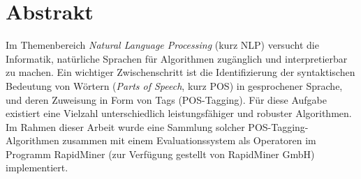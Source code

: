 %
\chapter*{Abstrakt}
\label{sec:abstract}
\vspace*{-10mm}

Im Themenbereich \textit{Natural Language Processing} (kurz NLP) versucht die Informatik, natürliche Sprachen für Algorithmen zugänglich und interpretierbar zu machen. Ein wichtiger Zwischenschritt ist die Identifizierung der syntaktischen Bedeutung von Wörtern (\textit{Parts of Speech}, kurz POS) in gesprochener Sprache, und deren Zuweisung in Form von Tags (POS-Tagging). Für diese Aufgabe existiert eine Vielzahl unterschiedlich leistungsfähiger und robuster Algorithmen.
\newline
Im Rahmen dieser Arbeit wurde eine Sammlung solcher POS-Tagging-Algorithmen zusammen mit einem Evaluationssystem als Operatoren im Programm RapidMiner (zur Verfügung gestellt von RapidMiner GmbH) implementiert.


